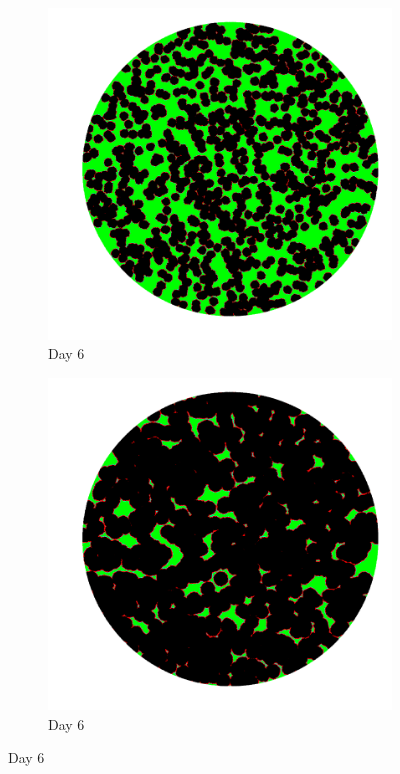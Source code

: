 \documentclass[a4paper]{article}
\begin{document}
\begin{center}
\begin{minipage}{0.65\linewidth}
\begin{figure}[H]
    \begin{subfigure}[b]{0.4\linewidth}
        \includegraphics[width=\linewidth]{cell_to_cell_photos/celltocell3.png}
        \caption{Day 6}
    \end{subfigure}
    \begin{subfigure}[b]{0.4\linewidth}
        \includegraphics[width=\linewidth]{cell_free_photos/cellfree3.png}
        \caption{Day 6}
    \end{subfigure}
    

\end{figure}
\end{minipage}
\end{center}
\end{document}
